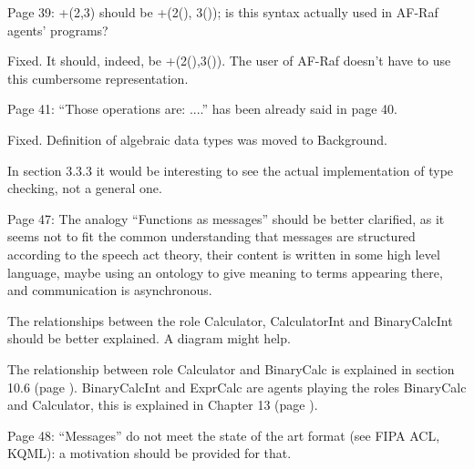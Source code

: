 \documentclass{article}
\newcommand{\todo}[1]{[\textcolor{red}{TODO}: #1]}
\newenvironment{them}{\noindent\begingroup\color{blue}}{\endgroup\par}
\begin{document}
\begin{them}

Page 39:
+(2,3) should be +(2(), 3()); is this syntax actually used in AF-Raf agents'
programs?

\end{them}
Fixed. It should, indeed, be +(2(),3()). The user of AF-Raf doesn't have to use
this cumbersome representation.

\begin{them}

Page 41:
“Those operations are: ....” has been already said in page 40.
\end{them}
Fixed. Definition of algebraic data types was moved to Background.

\begin{them}

In section 3.3.3 it would be interesting to see the actual implementation of
type checking, not a general one.

\end{them}
\todo{Implement the type checker}

\begin{them}

Page 47:
The analogy “Functions as messages” should be better clarified, as it seems not
to fit the common understanding that messages are structured according to the
speech act theory, their content is written in some high level language, maybe
using an ontology to give meaning to terms appearing there, and communication
is asynchronous.

\end{them}
\todo{?}

\begin{them}

The relationships between the role Calculator, CalculatorInt and BinaryCalcInt
should be better explained. A diagram might help.

\end{them}
The relationship between role Calculator and BinaryCalc is explained in section
10.6 (page ). BinaryCalcInt and ExprCalc are agents playing the roles
BinaryCalc and Calculator, this is explained in Chapter 13 (page ).

\begin{them}

Page 48:
“Messages” do not meet the state of the art format (see FIPA ACL, KQML): a
motivation should be provided for that.

\end{them}
\todo{?}
\end{document}
